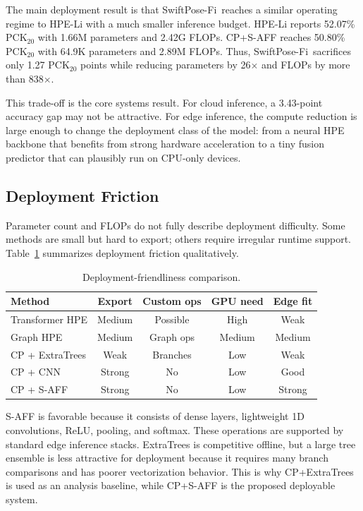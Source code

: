 \documentclass[10pt,conference]{IEEEtran}
\newcommand{\method}{SwiftPose-Fi}
\begin{document}
The main deployment result is that \method\ reaches a similar operating regime to HPE-Li with a much smaller inference budget. HPE-Li reports 52.07\% PCK$_{20}$ with 1.66M parameters and 2.42G FLOPs. CP+S-AFF reaches 50.80\% PCK$_{20}$ with 64.9K parameters and 2.89M FLOPs. Thus, \method\ sacrifices only 1.27 PCK$_{20}$ points while reducing parameters by 26$\times$ and FLOPs by more than 838$\times$.

This trade-off is the core systems result. For cloud inference, a 3.43-point accuracy gap may not be attractive. For edge inference, the compute reduction is large enough to change the deployment class of the model: from a neural HPE backbone that benefits from strong hardware acceleration to a tiny fusion predictor that can plausibly run on CPU-only devices.

\subsection{Deployment Friction}

Parameter count and FLOPs do not fully describe deployment difficulty. Some methods are small but hard to export; others require irregular runtime support. Table~\ref{tab:deployment_friction} summarizes deployment friction qualitatively.

\begin{table}[t]
\centering
\caption{Deployment-friendliness comparison.}
\label{tab:deployment_friction}
\begin{tabular}{lcccc}
\toprule
Method & Export & Custom ops & GPU need & Edge fit \\
\midrule
Transformer HPE & Medium & Possible & High & Weak \\
Graph HPE & Medium & Graph ops & Medium & Medium \\
CP + ExtraTrees & Weak & Branches & Low & Weak \\
CP + CNN & Strong & No & Low & Good \\
CP + S-AFF & Strong & No & Low & Strong \\
\bottomrule
\end{tabular}
\end{table}

S-AFF is favorable because it consists of dense layers, lightweight 1D convolutions, ReLU, pooling, and softmax. These operations are supported by standard edge inference stacks. ExtraTrees is competitive offline, but a large tree ensemble is less attractive for deployment because it requires many branch comparisons and has poorer vectorization behavior. This is why CP+ExtraTrees is used as an analysis baseline, while CP+S-AFF is the proposed deployable system.
\end{document}

